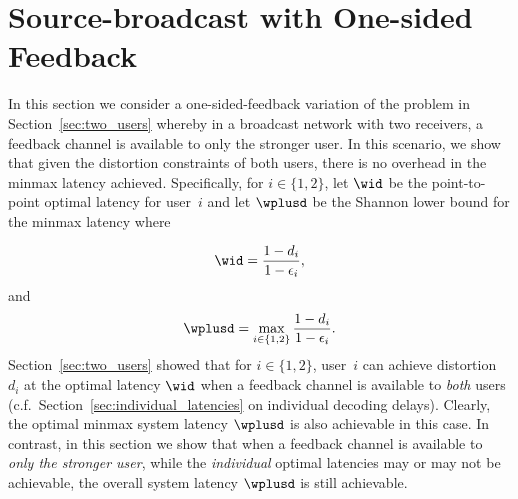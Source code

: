 \section{Source-broadcast with One-sided Feedback}
\label{sec:one_sided_feedback}

In this section we consider a one-sided-feedback variation of the problem in Section~\ref{sec:two_users} whereby in a broadcast network with two receivers, a feedback channel is available to only the stronger user.  In this scenario, we show that given the distortion constraints of both users, there is no overhead in the minmax latency achieved.  Specifically, for $i \in \{1, 2\}$, let $\wid$ be the point-to-point optimal latency for user~$i$ and let $\wplusd$ be the Shannon lower bound for the minmax latency where

\begin{align}
\label{eq:wid_optimal}
	\wid = \frac{1 - d_i}{1 - \epsilon_i},
\end{align}
and
\begin{align}
\label{eq:wplusd}
	\wplusd = \max_{i \in \{1, 2\}} \frac{1 - d_i}{1 - \epsilon_i}.
\end{align}
Section~\ref{sec:two_users} showed that for $i \in \{1, 2\}$, user~$i$ can achieve distortion $d_i$ at the optimal latency $\wid$ when a feedback channel is available to \emph{both} users (c.f.\ Section~\ref{sec:individual_latencies} on individual decoding delays).  Clearly, the optimal minmax system latency $\wplusd$ is also achievable in this case.  In contrast, in this section we show that when a feedback channel is available to \emph{only the stronger user}, while the \emph{individual} optimal latencies may or may not be achievable, the overall system latency $\wplusd$ is still achievable.






